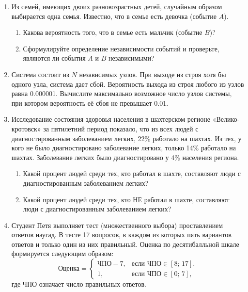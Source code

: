\documentclass[12pt, a4paper]{article}\usepackage[]{graphicx}\usepackage[]{color}
\begin{document}
\begin{enumerate}
\item  Из семей, имеющих двоих разновозрастных детей, случайным образом выбирается одна семья. Известно, что в семье есть девочка (событие $A$).

\begin{enumerate}
\item	Какова вероятность того, что в семье есть мальчик (событие $B$)?

\item	Сформулируйте определение независимости событий и проверьте, являются ли события $A$ и $B$ независимыми?
\end{enumerate}

\item  Система состоит из $N$ независимых узлов. При выходе из строя хотя бы одного узла, система дает сбой. Вероятность выхода из строя любого из узлов равна 0.000001. Вычислите максимально возможное число узлов системы, при котором вероятность её сбоя не превышает 0.01.

\item  Исследование состояния здоровья населения в шахтерском регионе «Велико-кротовск» за пятилетний период показало, что из всех людей с диагностированным заболеванием легких, 22\% работало на шахтах. Из тех, у кого не было диагностировано заболевание легких, только 14\% работало на шахтах. Заболевание легких было диагностировано у 4\% населения региона.

\begin{enumerate}
\item	Какой процент людей среди тех, кто работал в шахте, составляют люди с диагностированным заболеванием легких?

\item	Какой процент людей среди тех, кто НЕ работал в шахте, составляют люди с диагностированным заболеванием легких?
\end{enumerate}

\item  Студент Петя выполняет тест (множественного выбора) проставлением ответов наугад. В тесте 17 вопросов, в каждом из которых пять вариантов ответов и только один из них правильный. Оценка по десятибалльной шкале формируется следующим образом:
\[
    \text{Оценка} = \left\{
                      \begin{array}{ll}
                        \text{ЧПО} - 7, & \text{если $\text{ЧПО}\in [8;\,17]$,} \\
                        1,              & \text{если $\text{ЧПО}\in [0;\,7]$,}
                      \end{array}
                    \right.
\]
где ЧПО означает число правильных ответов.


\end{enumerate}
\end{document}
